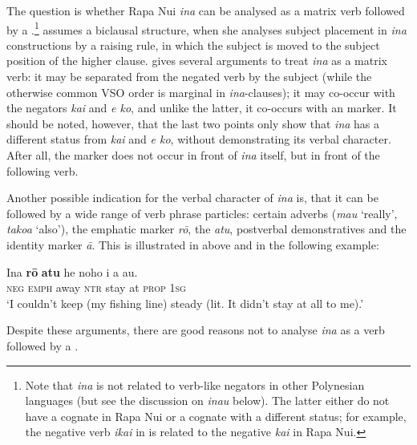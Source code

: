 The question is whether Rapa Nui \textit{{\ꞌ}ina} can be analysed as a matrix verb followed by a .\footnote{\label{fn:494}Note that \textit{{\ꞌ}ina} is not related to verb-like negators in other Polynesian languages (but see the discussion on  \textit{inau} below). The latter either do not have a cognate in Rapa Nui or a cognate with a different status; for example, the negative verb \textit{{\ꞌ}ikai} in  is related to the negative  \textit{kai} in Rapa Nui.} \citet[57]{WeberN2003} assumes a biclausal structure, when she analyses subject placement in \textit{{\ꞌ}ina} constructions by a raising rule, in which the subject is moved to the subject position of the higher clause. \citet[159–160]{Stenson1981} gives several arguments to treat \textit{{\ꞌ}ina} as a matrix verb: it may be separated from the negated verb by the subject (while the otherwise common VSO order is marginal in \textit{{\ꞌ}ina}-clauses); it may co-occur with the negators \textit{kai} and \textit{e ko}, and unlike the latter, it co-occurs with an  marker. It should be noted, however, that the last two points only show that \textit{{\ꞌ}ina} has a different status from \textit{kai} and \textit{e ko}, without demonstrating its verbal character. After all, the  marker does not occur in front of \textit{{\ꞌ}ina} itself, but in front of the following verb.

Another possible indication for the verbal character of \textit{{\ꞌ}ina} is, that it can be followed by a wide range of verb phrase particles: certain adverbs (\textit{mau} ‘really’, \textit{\mbox{tako{\ꞌ}a}} ‘also’), the emphatic marker \textit{rō}, the  \textit{atu}, postverbal demonstratives and the identity marker \textit{{\ꞌ}ā}. This is illustrated in  above and in the following example:

\ea\label{ex:10.113}
\gll {\ꞌ}Ina \textbf{rō} \textbf{atu} he noho i a au. \\
\textsc{neg} \textsc{emph} away \textsc{ntr} stay at \textsc{prop} \textsc{1sg} \\

\glt 
‘I couldn’t keep (my fishing line) steady (lit. It didn’t stay at all to me).’ \textstyleExampleref{[R230.162]} 
\z

Despite these arguments, there are good reasons not to analyse \textit{{\ꞌ}ina} as a verb followed by a . 

